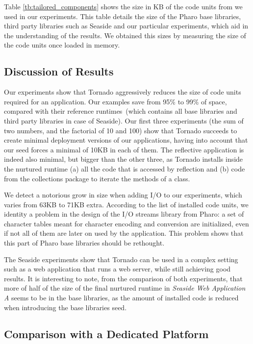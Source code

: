 Table \ref{tb:tailored_components} shows the size in KB of the code units from we used in our experiments. This table details the size of the Pharo base libraries, third party libraries such as Seaside and our particular experiments, which aid in the understanding of the results. We obtained this sizes by measuring the size of the code units once loaded in memory.

\subsection{Discussion of Results}
Our experiments show that Tornado aggressively reduces the size of code units required for an application. Our examples save from 95\% to 99\% of space, compared with their reference runtimes~(which contains all base libraries and third party libraries in case of Seaside). Our first three experiments (the sum of two numbers, and the factorial of 10 and 100) show that Tornado succeeds to create minimal deployment versions of our applications, having into account that our seed forces a minimal of 10KB in each of them. The reflective application is indeed also minimal, but bigger than the other three, as Tornado installs inside the nurtured runtime (a) all the code that is accessed by reflection and (b) code from the collections package to iterate the methods of a class.

We detect a notorious grow in size when adding I/O to our experiments, which varies from 63KB to 71KB extra. According to the list of installed code units, we identity a problem in the design of the I/O streams library from Pharo: a set of character tables meant for character encoding and conversion are initialized, even if not all of them are later on used by the application. This problem shows that this part of Pharo base libraries should be rethought.

The Seaside experiments show that Tornado can be used in a complex setting such as a web application that runs a web server, while still achieving good results. It is interesting to note, from the comparison of both experiments, that more of half of the size of the final nurtured runtime in \emph{Seaside Web Application A} seems to be in the base libraries, as the amount of installed code is reduced when introducing the base libraries seed.

\subsection{Comparison with a Dedicated Platform}

